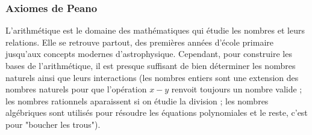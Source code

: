 \documentclass[12pt, a4paper]{article}
\begin{document}
%


\subsubsection*{Axiomes de Peano}
L'arithmétique est le domaine des mathématiques qui étudie les nombres et leurs relations.
Elle se retrouve partout, des premières années d'école primaire jusqu'aux concepts modernes d'astrophysique.
Cependant, pour construire les bases de l'arithmétique, il est presque suffisant de bien déterminer les nombres naturels ainsi que leurs interactions
(les nombres entiers sont une extension des nombres naturels pour que l'opération $x - y$ renvoit toujours un nombre valide ; les nombres rationnels aparaissent si on étudie la division ; les nombres algébriques sont utilisés pour résoudre les équations polynomiales et le reste, c'est pour "boucher les trous").
\end{document}
